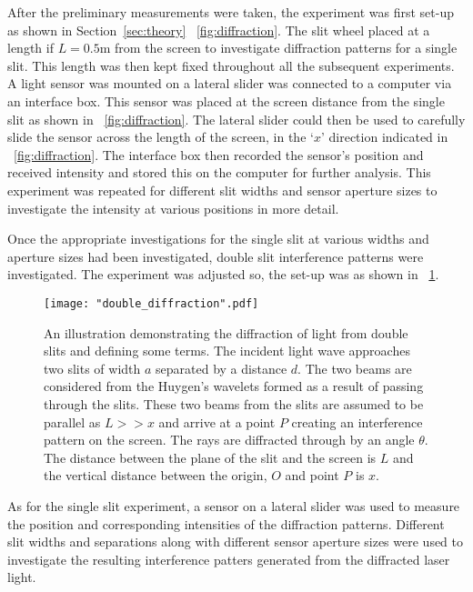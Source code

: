 \documentclass{article}
\newcommand{\figref}[2][\figurename~]{#1\ref{#2}}
\newcommand{\secref}[2][Section~]{#1\ref{#2}}
\begin{document}
\vspace{2mm}
\noindent
After the preliminary measurements were taken, the experiment was first set-up as shown in \secref{sec:theory} \figref{fig:diffraction}. The slit wheel placed at a length if $L = 0.5$m from the screen to investigate diffraction patterns for a single slit. This length was then kept fixed throughout all the subsequent experiments. A light sensor was mounted on a lateral slider was connected to a computer via an interface box. This sensor was placed at the screen distance from the single slit as shown in \figref{fig:diffraction}. The lateral slider could then be used to carefully slide the sensor across the length of the screen, in the `$x$' direction indicated in \figref{fig:diffraction}. The interface box then recorded the sensor's position and received intensity and stored this on the computer for further analysis. This experiment was repeated for different slit widths and sensor aperture sizes to investigate the intensity at various positions in more detail.

\vspace{2mm}
\noindent
Once the appropriate investigations for the single slit at various widths and aperture sizes had been investigated, double slit interference patterns were investigated. The experiment was adjusted so, the set-up was as shown in \figref{fig:double_diffraction}.

\begin{figure}[h]
\centering
\texttt{[image: "double\_diffraction".pdf]}
\caption{An illustration demonstrating the diffraction of light from double slits and defining some terms. The incident light wave approaches two slits of width $a$ separated by a distance $d$. The two beams are considered from the Huygen's wavelets \cite{Book01} formed as a result of passing through the slits. These two beams from the slits are assumed to be parallel as $L >> x$ and arrive at a point $P$ creating an interference pattern on the screen. The rays are diffracted through by an angle $\theta$. The distance between the plane of the slit and the screen is $L$ and the vertical distance between the origin, $O$ and point $P$ is $x$.}
\label{fig:double_diffraction}
\end{figure}

\vspace{2mm}
\noindent
As for the single slit experiment, a sensor on a lateral slider was used to measure the position and corresponding intensities of the diffraction patterns. Different slit widths and separations along with different sensor aperture sizes were used to investigate the resulting interference patters generated from the diffracted laser light.
\end{document}
